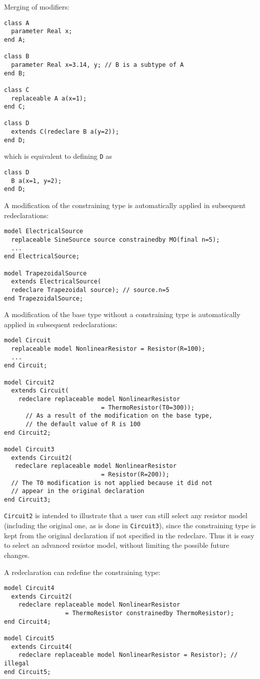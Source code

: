 \begin{example}
Merging of modifiers:
\begin{lstlisting}[language=modelica]
class A
  parameter Real x;
end A;

class B
  parameter Real x=3.14, y; // B is a subtype of A
end B;

class C
  replaceable A a(x=1);
end C;

class D
  extends C(redeclare B a(y=2));
end D;
\end{lstlisting}
which is equivalent to defining \lstinline!D! as
\begin{lstlisting}[language=modelica]
class D
  B a(x=1, y=2);
end D;
\end{lstlisting}

A modification of the constraining type is automatically applied
in subsequent redeclarations:
\begin{lstlisting}[language=modelica]
model ElectricalSource
  replaceable SineSource source constrainedby MO(final n=5);
  ...
end ElectricalSource;

model TrapezoidalSource
  extends ElectricalSource(
  redeclare Trapezoidal source); // source.n=5
end TrapezoidalSource;
\end{lstlisting}

A modification of the base type without a constraining type is
automatically applied in subsequent redeclarations:
\begin{lstlisting}[language=modelica]
model Circuit
  replaceable model NonlinearResistor = Resistor(R=100);
  ...
end Circuit;

model Circuit2
  extends Circuit(
    redeclare replaceable model NonlinearResistor
                           = ThermoResistor(T0=300));
      // As a result of the modification on the base type,
      // the default value of R is 100
end Circuit2;

model Circuit3
  extends Circuit2(
   redeclare replaceable model NonlinearResistor
                           = Resistor(R=200));
  // The T0 modification is not applied because it did not
  // appear in the original declaration
end Circuit3;
\end{lstlisting}

\lstinline!Circuit2! is intended to illustrate that a user can still select
any resistor model (including the original one, as is done in \lstinline!Circuit3!),
since the constraining type is kept from the original declaration if not
specified in the redeclare. Thus it is easy to select an advanced
resistor model, without limiting the possible future changes.

A redeclaration can redefine the constraining type:
\begin{lstlisting}[language=modelica]
model Circuit4
  extends Circuit2(
    redeclare replaceable model NonlinearResistor
                 = ThermoResistor constrainedby ThermoResistor);
end Circuit4;

model Circuit5
  extends Circuit4(
    redeclare replaceable model NonlinearResistor = Resistor); // illegal
end Circuit5;
\end{lstlisting}
\end{example}

